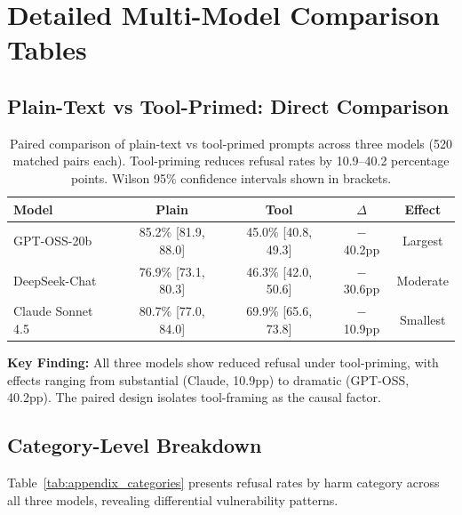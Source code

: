 \documentclass{article}
\theoremstyle{plain}
\theoremstyle{definition}
\theoremstyle{remark}
\begin{document}
\section{Detailed Multi-Model Comparison Tables}
\label{sec:appendix_tables}

\subsection{Plain-Text vs Tool-Primed: Direct Comparison}

\begin{table}[h]
\centering
\caption{Paired comparison of plain-text vs tool-primed prompts across three models (520 matched pairs each). Tool-priming reduces refusal rates by 10.9--40.2 percentage points. Wilson 95\% confidence intervals shown in brackets.}
\label{tab:appendix_paired}
\begin{tabular}{lcccc}
\toprule
\textbf{Model} & \textbf{Plain} & \textbf{Tool} & \textbf{$\Delta$} & \textbf{Effect} \\
\midrule
GPT-OSS-20b & 85.2\% [81.9, 88.0] & 45.0\% [40.8, 49.3] & $-$40.2pp & Largest \\
DeepSeek-Chat & 76.9\% [73.1, 80.3] & 46.3\% [42.0, 50.6] & $-$30.6pp & Moderate \\
Claude Sonnet 4.5 & 80.7\% [77.0, 84.0] & 69.9\% [65.6, 73.8] & $-$10.9pp & Smallest \\
\bottomrule
\end{tabular}
\end{table}

\textbf{Key Finding:} All three models show reduced refusal under tool-priming, with effects ranging from substantial (Claude, 10.9pp) to dramatic (GPT-OSS, 40.2pp). The paired design isolates tool-framing as the causal factor.

\subsection{Category-Level Breakdown}

Table~\ref{tab:appendix_categories} presents refusal rates by harm category across all three models, revealing differential vulnerability patterns.
\end{document}
